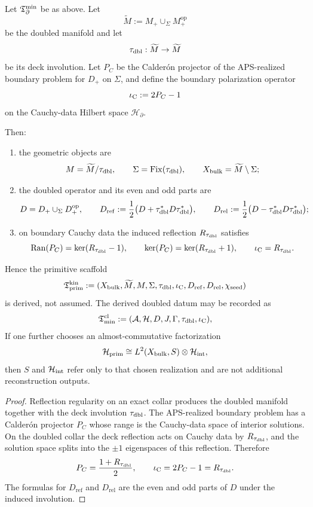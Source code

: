 \begin{theorem}
\label{thm:primitive-datum-from-reduced-datum}
\label{thm:primitive-scaffold-from-reduced-datum}
Let $\mathfrak T_{\partial}^{\min}$ be as above. Let
\[
\widetilde M:=M_+\cup_{\Sigma} M_+^{\mathrm{op}}
\]
be the doubled manifold and let
\[
\tau_{\mathrm{dbl}}:\widetilde M\to\widetilde M
\]
be its deck involution. Let $P_C$ be the Calder\'on projector of the APS-realized boundary problem
for $D_+$ on $\Sigma$, and define the boundary polarization operator
\[
\iota_{\mathrm C}:=2P_C-1
\]
on the Cauchy-data Hilbert space $\mathcal H_{\partial}$.

Then:
\begin{enumerate}[label=(\roman*), leftmargin=1.8em, topsep=3pt, itemsep=2pt]
    \item the geometric objects are
    \[
    M=\widetilde M/\tau_{\mathrm{dbl}},
    \qquad
    \Sigma=\mathrm{Fix}(\tau_{\mathrm{dbl}}),
    \qquad
    X_{\mathrm{bulk}}=\widetilde M\setminus\Sigma;
    \]
    \item the doubled operator and its even and odd parts are
    \[
    D=D_+\cup_{\Sigma}D_+^{\mathrm{op}},
    \qquad
    D_{\mathrm{ref}}:=\frac12\bigl(D+\tau_{\mathrm{dbl}}^{\ast}D\tau_{\mathrm{dbl}}^{\ast}\bigr),
    \qquad
    D_{\mathrm{rel}}:=\frac12\bigl(D-\tau_{\mathrm{dbl}}^{\ast}D\tau_{\mathrm{dbl}}^{\ast}\bigr);
    \]
    \item on boundary Cauchy data the induced reflection $R_{\tau_{\mathrm{dbl}}}$ satisfies
    \[
    \operatorname{Ran}(P_C)=\ker(R_{\tau_{\mathrm{dbl}}}-1),
    \qquad
    \ker(P_C)=\ker(R_{\tau_{\mathrm{dbl}}}+1),
    \qquad
    \iota_{\mathrm C}=R_{\tau_{\mathrm{dbl}}}.
    \]
\end{enumerate}
Hence the primitive scaffold
\[
\mathfrak T_{\mathrm{prim}}^{\mathrm{kin}}
:=
(X_{\mathrm{bulk}},\widetilde M,M,\Sigma,\tau_{\mathrm{dbl}},\iota_{\mathrm C},D_{\mathrm{ref}},D_{\mathrm{rel}},\chi_{\mathrm{seed}})
\]
is derived, not assumed. The derived doubled datum may be recorded as
\[
\mathfrak T_{\mathrm{min}}^{\mathrm{cl}}:=(\mathcal A,\mathcal H,D,J,\Gamma,\tau_{\mathrm{dbl}},\iota_{\mathrm C}),
\]
If one further chooses an almost-commutative factorization
\[
\mathcal H_{\mathrm{prim}}\cong L^2(X_{\mathrm{bulk}},S)\otimes \mathcal H_{\mathrm{int}},
\]
then $S$ and $\mathcal H_{\mathrm{int}}$ refer only to that chosen realization and are not additional
reconstruction outputs.
\end{theorem}

\begin{proof}
Reflection regularity on an exact collar produces the doubled manifold together with the deck
involution $\tau_{\mathrm{dbl}}$. The APS-realized boundary problem has a Calder\'on projector $P_C$ whose
range is the Cauchy-data space of interior solutions. On the doubled collar the deck reflection
acts on Cauchy data by $R_{\tau_{\mathrm{dbl}}}$, and the solution space splits into the $\pm1$ eigenspaces of
this reflection. Therefore
\[
P_C=\frac{1+R_{\tau_{\mathrm{dbl}}}}{2},
\qquad
\iota_{\mathrm C}=2P_C-1=R_{\tau_{\mathrm{dbl}}}.
\]
The formulas for $D_{\mathrm{ref}}$ and $D_{\mathrm{rel}}$ are the even and odd parts of $D$ under
the induced involution.
\end{proof}

